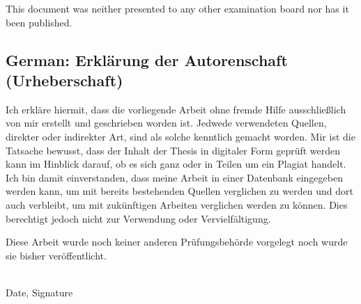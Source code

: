 \documentclass[a4paper,11pt,oneside]{article}
\theoremstyle{definition}
\begin{document}
This document was neither presented to any other examination board
nor has it been published.

\subsection*{German: Erklärung der Autorenschaft (Urheberschaft)}

Ich erkläre hiermit, dass die vorliegende Arbeit ohne fremde Hilfe
ausschließlich von mir erstellt und geschrieben worden ist. Jedwede
verwendeten Quellen, direkter oder indirekter Art, sind als solche
kenntlich gemacht worden. Mir ist die Tatsache bewusst, dass der
Inhalt der Thesis in digitaler Form geprüft werden kann im Hinblick
darauf, ob es sich ganz oder in Teilen um ein Plagiat handelt. Ich
bin damit einverstanden, dass meine Arbeit in einer Datenbank
eingegeben werden kann, um mit bereits bestehenden Quellen
verglichen zu werden und dort auch verbleibt, um mit zukünftigen
Arbeiten verglichen werden zu können. Dies berechtigt jedoch nicht
zur Verwendung oder Vervielfältigung.

Diese Arbeit wurde noch keiner anderen Prüfungsbehörde vorgelegt
noch wurde sie bisher veröffentlicht.

\vspace{20mm}

\dotfill\\
Date, Signature
\end{document}
